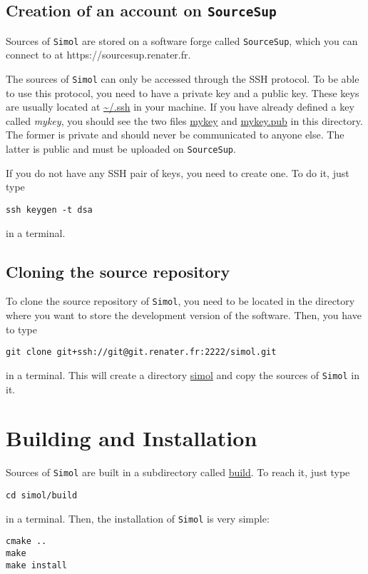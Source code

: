 \documentclass[12pt]{book}
\newcommand{\Simol}{\texttt{Simol}\xspace}
\newcommand{\SourceSup}{\texttt{SourceSup}\xspace}
\newcommand{\urlSourceSup}{https://sourcesup.renater.fr}
\begin{document}
\subsection{Creation of an account on \SourceSup}

Sources of \Simol are stored on a software forge called \SourceSup, which you can connect to at \urlSourceSup.  

The sources of \Simol can only be accessed through the SSH protocol. To be able to use this protocol, you need to have a private key and a public key. These keys are usually located at \url{~/.ssh} in your machine. If you have already defined a key called \textit{mykey}, you should see the two files \url{mykey} and \url{mykey.pub} in this directory. The former is private and should never be communicated to anyone else. The latter is public and must be uploaded on \SourceSup. 

If you do not have any SSH pair of keys, you need to create one. To do it, just type
\lstset{language=bash} 
\begin{lstlisting}
ssh keygen -t dsa
\end{lstlisting}
in a terminal.


\subsection{Cloning the source repository}

To clone the source repository of \Simol, you need to be located in the directory where you want to store the development version of the software. Then, you have to type
\lstset{language=bash} 
\begin{lstlisting}
git clone git+ssh://git@git.renater.fr:2222/simol.git
\end{lstlisting}
in a terminal. This will create a directory \url{simol} and copy the sources of \Simol in it.

\section{Building and Installation}

Sources of \Simol are built in a subdirectory called \url{build}. To reach it, just type
\lstset{language=bash} 
\begin{lstlisting}
cd simol/build
\end{lstlisting}
in a terminal. Then, the installation of \Simol is very simple:
\lstset{language=bash} 
\begin{lstlisting}
cmake ..
make
make install
\end{lstlisting}
\end{document}
